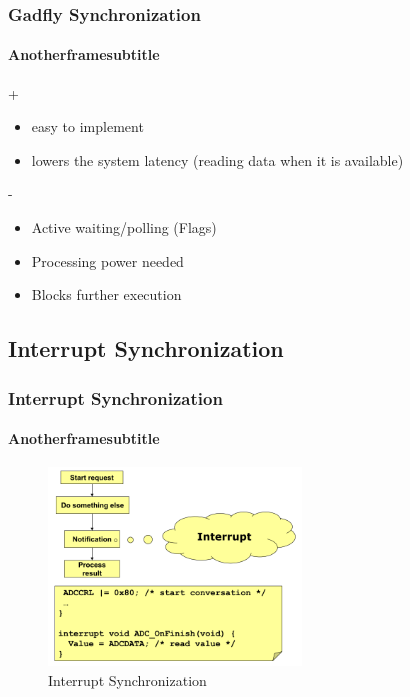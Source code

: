 \begin{frame}
    \frametitle{Gadfly Synchronization}
    \framesubtitle{Anotherframesubtitle}
	\begin{exampleblock}{+}
        \begin{itemize}
			\item easy to implement
			\item lowers the system latency (reading data when it is available)         
    	\end{itemize}
   	\end{exampleblock}	
	\begin{alertblock}{-}    
    	\begin{itemize}
			\item Active waiting/polling (Flags)
			\item Processing power needed 
			\item Blocks further execution 
	     \end{itemize}
	\end{alertblock}   
\end{frame}

\subsection{Interrupt Synchronization}
\begin{frame}
    \frametitle{Interrupt Synchronization}
    \framesubtitle{Anotherframesubtitle}
    \begin{figure}
        \includegraphics[width=0.6\textwidth]{fig/interrupt.png}
        \caption{Interrupt Synchronization}
    \end{figure}
        
\end{frame}


